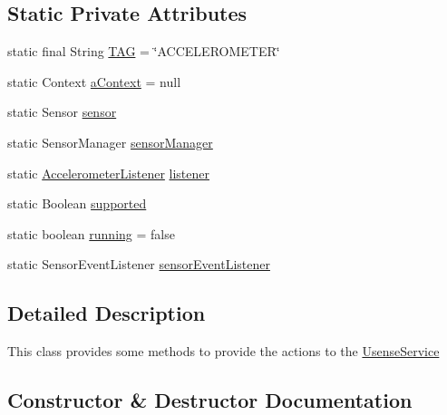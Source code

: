\subsection*{Static Private Attributes}
\begin{DoxyCompactItemize}
\item 
static final String \hyperlink{classcs_1_1usense_1_1accelerometer_1_1_acceler_sen_manager_aa9164433aafc7854e44b1fb0026aa269}{T\+A\+G} = \char`\"{}A\+C\+C\+E\+L\+E\+R\+O\+M\+E\+T\+E\+R\char`\"{}
\item 
static Context \hyperlink{classcs_1_1usense_1_1accelerometer_1_1_acceler_sen_manager_a032d88532ab204a46d656e84b8cfa4d7}{a\+Context} = null
\item 
static Sensor \hyperlink{classcs_1_1usense_1_1accelerometer_1_1_acceler_sen_manager_a3c7fbe02cf84f49c2e86d54bea076a52}{sensor}
\item 
static Sensor\+Manager \hyperlink{classcs_1_1usense_1_1accelerometer_1_1_acceler_sen_manager_ae61bba99e8cd255020dbe54154ec9b16}{sensor\+Manager}
\item 
static \hyperlink{interfacecs_1_1usense_1_1accelerometer_1_1_accelerometer_listener}{Accelerometer\+Listener} \hyperlink{classcs_1_1usense_1_1accelerometer_1_1_acceler_sen_manager_a278bf3a86e3b16f38808b6956e3ece8d}{listener}
\item 
static Boolean \hyperlink{classcs_1_1usense_1_1accelerometer_1_1_acceler_sen_manager_a91923331c2cbcbe9ba024b484a7c2f50}{supported}
\item 
static boolean \hyperlink{classcs_1_1usense_1_1accelerometer_1_1_acceler_sen_manager_ac1c4fff64fb479d3a4163cc29192a463}{running} = false
\item 
static Sensor\+Event\+Listener \hyperlink{classcs_1_1usense_1_1accelerometer_1_1_acceler_sen_manager_a84a1a9276e1f31ea8f0bcec849fa8b1c}{sensor\+Event\+Listener}
\end{DoxyCompactItemize}


\subsection{Detailed Description}
This class provides some methods to provide the actions to the \hyperlink{classcs_1_1usense_1_1_usense_service}{Usense\+Service} 

\subsection{Constructor \& Destructor Documentation}
\hypertarget{classcs_1_1usense_1_1accelerometer_1_1_acceler_sen_manager_a71edb1c313c34b381be833cec8b7eefd}{}
